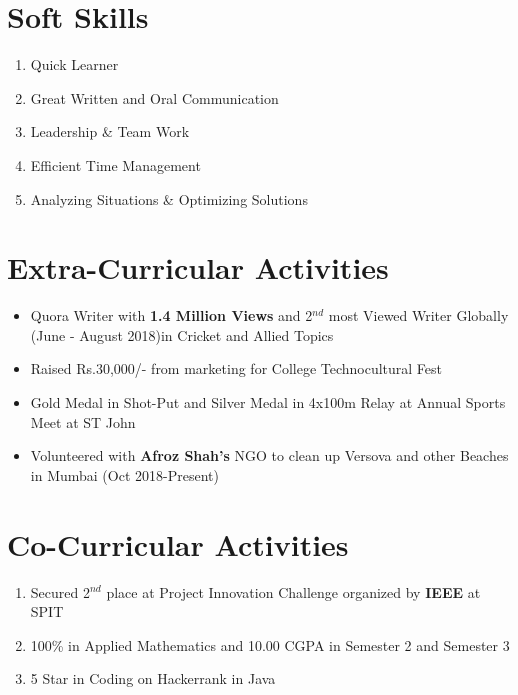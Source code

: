 \documentclass[11pt,a4paper,sans]{moderncv}   %
\begin{document}
	
	
	
\section{Soft Skills}
\begin{enumerate}
		\item Quick Learner				 
		\item Great Written and Oral Communication
		\item Leadership \& Team Work
		\item Efficient Time Management
		\item Analyzing Situations \& Optimizing Solutions 
		 		
\end{enumerate}



\section{Extra-Curricular Activities}

\begin{itemize}
	\item Quora Writer with \textbf{1.4 Million Views} and 2$^{nd}$ most Viewed Writer Globally (June - August 2018)in Cricket and Allied Topics   
	\item Raised Rs.30,000/- from marketing for College Technocultural Fest
	\item Gold Medal in Shot-Put and Silver Medal in 4x100m Relay at Annual Sports Meet at ST John
	\item Volunteered with \textbf{Afroz Shah's} NGO to clean up Versova and other Beaches in Mumbai  (Oct 2018-Present)\\
	\end {itemize} 
	
	
	
	
	\section{Co-Curricular Activities}
	\begin{enumerate}
		\item Secured 2$^{nd}$ place at Project Innovation Challenge organized by \textbf{IEEE} at SPIT
		\item 100\% in Applied Mathematics and 10.00 CGPA in Semester 2 and Semester 3 
		\item 5 Star in Coding on Hackerrank in Java  
		\\
		
	\end{enumerate}
	
\end{document}
